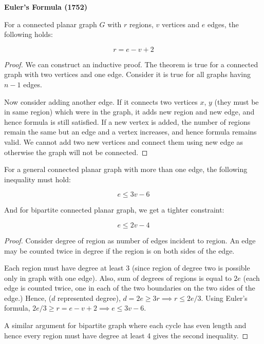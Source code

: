 \documentclass[10pt]{article}
\begin{document}
\begin{theorem}
    \textbf{Euler's Formula (1752)}

    For a connected planar graph $G$ with $r$ regions, $v$ vertices and $e$ edges, the following holds:

    \begin{equation}
        r = e - v + 2
    \end{equation}
\end{theorem}

\begin{proof}
    We can construct an inductive proof. The theorem is true for a connected graph with two vertices and one edge. Consider it is true for all graphs having $n-1$ edges.

    Now consider adding another edge. If it connects two vertices $x$, $y$ (they must be in same region) which were in the graph, it adds new region and new edge, and hence formula is still satisfied. If a new vertex is added, the number of regions remain the same but an edge and a vertex increases, and hence formula remains valid. We cannot add two new vertices and connect them using new edge as otherwise the graph will not be connected.
\end{proof}

\begin{theorem}
    For a general connected planar graph with more than one edge, the following inequality must hold:

    \begin{equation}
        e \leq 3v - 6
    \end{equation}

    And for bipartite connected planar graph, we get a tighter constraint:

    \begin{equation}
        e \leq 2v - 4
    \end{equation}
\end{theorem}

\begin{proof}
    Consider degree of region as number of edges incident to region. An edge may be counted twice in degree if the region is on both sides of the edge.

    Each region must have degree at least 3 (since region of degree two is possible only in graph with one edge). Also, sum of degrees of regions is equal to $2e$ (each edge is counted twice, one in each of the two boundaries on the two sides of the edge.) Hence, ($d$ represented degree), $d  = 2e \geq 3r \implies r \leq 2e / 3 $. Using Euler's formula, $2e / 3 \geq r = e - v + 2 \implies e \leq 3v - 6$.

    A similar argument for bipartite graph where each cycle has even length and hence every region must have degree at least 4 gives the second inequality.
\end{proof}
\end{document}
